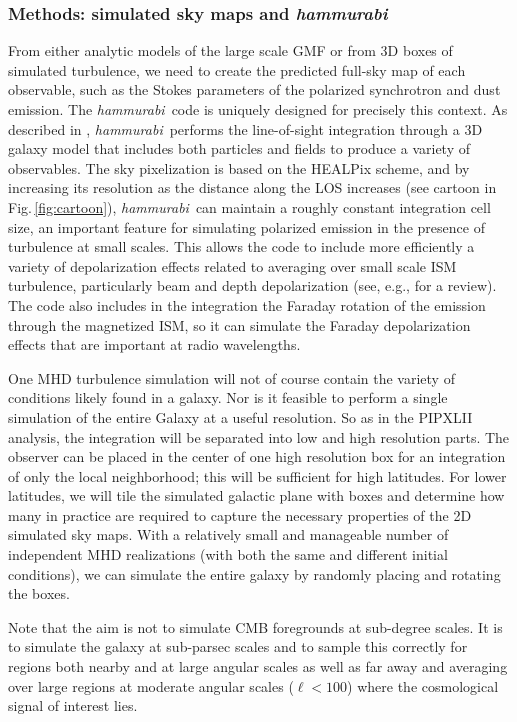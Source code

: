 \documentclass[12pt]{article}
\newcommand{\hammurabi}{\textsl{hammurabi}}
\begin{document}
\subsubsection*{Methods:  simulated sky maps and \hammurabi\ }

From either analytic models of the large scale GMF or from 3D boxes of simulated turbulence, we need to create the predicted full-sky map of each observable, such as the Stokes parameters of the polarized synchrotron and dust emission.  The \hammurabi\ code is uniquely designed for precisely this context. As described in \citet{waelkens:2009}, \hammurabi\ performs the line-of-sight integration through a 3D galaxy model that includes both particles and fields to produce a variety of observables. The sky pixelization is based on the HEALPix scheme, and by increasing its resolution as the distance along the LOS increases (see cartoon in Fig.\,\ref{fig:cartoon}), \hammurabi\ can maintain a roughly constant integration cell size, an important feature for simulating polarized emission in the presence of turbulence at small scales. This allows the code to include more efficiently a variety of depolarization effects related to averaging over small scale ISM turbulence, particularly beam and depth depolarization (see, e.g., \citealt{beck:2015} for a review). The code also includes in the integration the Faraday rotation of the emission through the magnetized ISM, so it can simulate the Faraday depolarization effects that are important at radio wavelengths.

One MHD turbulence simulation will not of course contain the variety of conditions likely found in a galaxy. Nor is it feasible to perform a single simulation of the entire Galaxy at a useful resolution. So as in the PIPXLII analysis, the integration will be separated into low and high resolution parts. The observer can be placed in the center of one high resolution box for an integration of only the local neighborhood; this will be sufficient for high latitudes. For lower latitudes, we will tile the simulated galactic plane with boxes and determine how many in practice are required to capture the necessary properties of the 2D simulated sky maps. With a relatively small and manageable number of independent MHD realizations (with both the same and different initial conditions), we can simulate the entire galaxy by randomly placing and rotating the boxes. 

Note that the aim is not to simulate CMB foregrounds at sub-degree scales.  It is to simulate the galaxy at sub-parsec scales and to sample this correctly for regions both nearby and at large angular scales as well as far away and averaging over large regions at moderate angular scales ($\ell<100$) where the cosmological signal of interest lies.  
\end{document}
